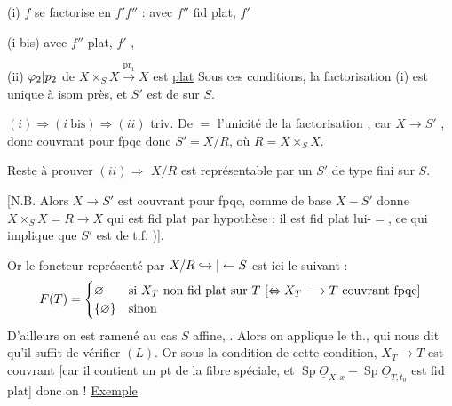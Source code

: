 (i) $f$ se factorise en $f'f''$ :  avec $f''$ fid plat, $f'$ 

(i bis)  avec $f''$ plat, $f'$ ,

(ii) $\varphi_2|p_2$ de $X\times_S X\xrightarrow{\mathrm{pr}_1}X$ est \uline{plat}
Sous ces conditions, la factorisation (i) est unique à isom près, et $S'$ est de   sur $S$.

$(i)\Rightarrow(i\ \mathrm{bis})\Rightarrow(ii)$ triv. De $=$ l'unicité de la factorisation , car $X\longrightarrow S'$ , donc couvrant pour fpqc donc $S'=X/R$, où $R=X\times_S X$.

Reste à prouver $(ii)\Rightarrow$  $X/R$ est représentable par un $S'$ de  type fini sur $S$. \deleted{[N.B. alors \unsure{cela} \unsure{quasi compact} sur $S$ car $X\longrightarrow S'$ est}

[N.B. Alors $X\longrightarrow S'$ est couvrant pour fpqc, comme  de base $X-S'$  donne $X\times_S X=R\longrightarrow X$ qui est fid plat par hypothèse ; il est fid plat  lui-$=$, ce qui implique  que $S'$ est  de t.f. )].

Or  le foncteur représenté par $X/R\hookrightarrow|\leftarrow S$ est ici le suivant :
\[
F(T)=\begin{cases}\varnothing&\text{si }X_T\text{ non fid plat sur }T\ [\Leftrightarrow X_T\longrightarrow T\text{ couvrant fpqc}]\\\{\varnothing\}&\text{sinon}\end{cases}
\]
D'ailleurs on est ramené au cas $S$ affine, .
 Alors on applique le th., qui nous dit qu'il suffit de vérifier  $(L)$. Or sous la condition de cette condition, $X_T\longrightarrow T$ est couvrant [car il contient un pt  de la fibre spéciale, et $\operatorname{Sp}\underline{O}_{X,x}-\operatorname{Sp}\underline{O}_{T,t_0}$ est fid plat] donc on  !
\uline{Exemple}

